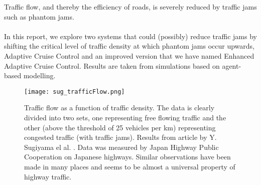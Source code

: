 Traffic flow, and thereby the efficiency of roads, is severely reduced by
traffic jams such as phantom jams.\\\\

In this report, we explore two systems that could (possibly) reduce traffic
jams by shifting the critical level of traffic density at which phantom jams
occur upwards, Adaptive Cruise Control and an improved version that we have
named Enhanced Adaptive Cruise Control. Results are taken from simulations
based on agent-based modelling.

\begin{figure}[H]
    \begin{center}
    \texttt{[image: sug\_trafficFlow.png]}
    \caption{\label{sug_flow}
Traffic flow as a function of traffic density. The data is clearly divided
into two sets, one representing free flowing traffic and the other (above the
threshold of 25 vehicles per km) representing congested traffic (with traffic
jams).  Results from article by Y. Sugiyama el al. \cite{sugiyama}.  Data was
measured by Japan Highway Public Cooperation on Japanese highways. Similar
observations have been made in many places and seems to be almost a universal
property of highway traffic.}
    \end{center}
\end{figure}

